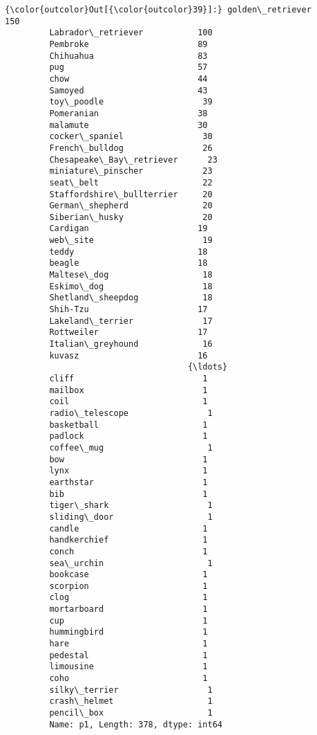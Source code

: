 \documentclass[11pt]{article}
\begin{document}
\begin{Verbatim}[commandchars=\\\{\}]
{\color{outcolor}Out[{\color{outcolor}39}]:} golden\_retriever             150
         Labrador\_retriever           100
         Pembroke                      89
         Chihuahua                     83
         pug                           57
         chow                          44
         Samoyed                       43
         toy\_poodle                    39
         Pomeranian                    38
         malamute                      30
         cocker\_spaniel                30
         French\_bulldog                26
         Chesapeake\_Bay\_retriever      23
         miniature\_pinscher            23
         seat\_belt                     22
         Staffordshire\_bullterrier     20
         German\_shepherd               20
         Siberian\_husky                20
         Cardigan                      19
         web\_site                      19
         teddy                         18
         beagle                        18
         Maltese\_dog                   18
         Eskimo\_dog                    18
         Shetland\_sheepdog             18
         Shih-Tzu                      17
         Lakeland\_terrier              17
         Rottweiler                    17
         Italian\_greyhound             16
         kuvasz                        16
                                     {\ldots} 
         cliff                          1
         mailbox                        1
         coil                           1
         radio\_telescope                1
         basketball                     1
         padlock                        1
         coffee\_mug                     1
         bow                            1
         lynx                           1
         earthstar                      1
         bib                            1
         tiger\_shark                    1
         sliding\_door                   1
         candle                         1
         handkerchief                   1
         conch                          1
         sea\_urchin                     1
         bookcase                       1
         scorpion                       1
         clog                           1
         mortarboard                    1
         cup                            1
         hummingbird                    1
         hare                           1
         pedestal                       1
         limousine                      1
         coho                           1
         silky\_terrier                  1
         crash\_helmet                   1
         pencil\_box                     1
         Name: p1, Length: 378, dtype: int64
\end{Verbatim}
            
\end{document}
